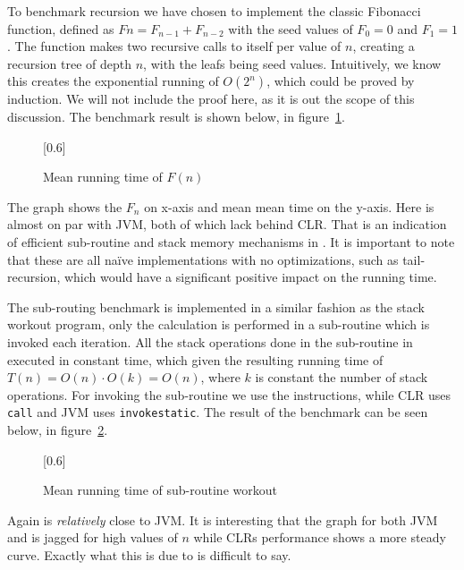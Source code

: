 
To benchmark recursion we have chosen to implement the classic Fibonacci
function, defined as $Fn = F_{n-1} + F_{n-2}$ with the seed values of $F_0 = 0$
and $F_1 = 1$. The function makes two recursive calls to itself per value of
$n$, creating a recursion tree of depth $n$, with the leafs being seed
values. Intuitively, we know this creates the exponential running of $O(2^n)$,
which could be proved by induction. We will not include the proof here, as it is
out the scope of this discussion. The benchmark result is shown below, in
figure~\ref{fig:eval:benchmark:fib}.

\begin{figure}[H]
  \centering
  \scalebox{0.8}[0.6]{}
  \caption{Mean running time of $F(n)$}
\label{fig:eval:benchmark:fib}
\end{figure}

The graph shows the $F_n$ on x-axis and mean mean time on the y-axis. Here
\thename{} is almost on par with JVM, both of which lack behind CLR. That is an
indication of efficient sub-routine and stack memory mechanisms in
\thename{}. It is important to note that these are all na\"ive implementations
with no optimizations, such as tail-recursion, which would have a significant
positive impact on the running time.


The sub-routing benchmark is implemented in a similar fashion as the stack
workout program, only the calculation is performed in a sub-routine which is
invoked each iteration. All the stack operations done in the sub-routine in
executed in constant time, which given the resulting running time of
$T(n) = O(n) \cdot O(k) = O(n)$, where $k$ is constant the number of stack
operations. For invoking the sub-routine we use the  instructions,
while CLR uses {\tt call} and JVM uses {\tt invokestatic}. The result of the
benchmark can be seen below, in figure~\ref{fig:eval:benchmark:invoc}.

\begin{figure}[H]
  \centering
  \scalebox{0.8}[0.6]{}
  \caption{Mean running time of sub-routine workout}
\label{fig:eval:benchmark:invoc}
\end{figure}

Again \thename{} is \emph{relatively} close to JVM. It is interesting that the
graph for both JVM and \thename{} is jagged for high values of $n$ while CLRs
performance shows a more steady curve. Exactly what this is due to is difficult
to say.

